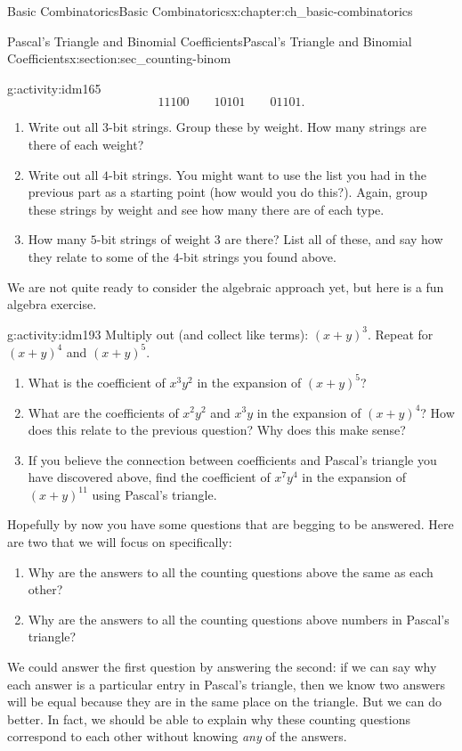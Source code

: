\documentclass[oneside,10pt,]{book}
\numberwithin{equation}{chapter}
\begin{document}
\begin{chapterptx}{Basic Combinatorics}{}{Basic Combinatorics}{}{}{x:chapter:ch_basic-combinatorics}
\begin{sectionptx}{Pascal's Triangle and Binomial Coefficients}{}{Pascal's Triangle and Binomial Coefficients}{}{}{x:section:sec_counting-binom}
\begin{activity}{}{g:activity:idm165}
\begin{equation*}
11100 \qquad 10101 \qquad 01101.
\end{equation*}
%
\begin{enumerate}[font=\bfseries,label=(\alph*),ref=\alph*]
\item{}Write out all \(3\)-bit strings.  Group these by weight.  How many strings are there of each weight?%
\item{}Write out all \(4\)-bit strings.  You might want to use the list you had in the previous part as a starting point (how would you do this?).  Again, group these strings by weight and see how many there are of each type.%
\item{}How many \(5\)-bit strings of weight 3 are there?  List all of these, and say how they relate to some of the \(4\)-bit strings you found above.%
\end{enumerate}
\end{activity}
We are not quite ready to consider the algebraic approach yet, but here is a fun algebra exercise.%
\begin{activity}{}{g:activity:idm193}%
Multiply out (and collect like terms): \((x+y)^3\).  Repeat for \((x+y)^4\) and \((x+y)^5\).%
\begin{enumerate}[font=\bfseries,label=(\alph*),ref=\alph*]
\item{}What is the coefficient of \(x^3y^2\) in the expansion of \((x+y)^5\)?%
\item{}What are the coefficients of \(x^2y^2\) and \(x^3y\) in the expansion of \((x+y)^4\)?  How does this relate to the previous question?  Why does this make sense?%
\item{}If you believe the connection between coefficients and Pascal's triangle you have discovered above, find the coefficient of \(x^7y^4\) in the expansion of \((x+y)^{11}\) using Pascal's triangle.%
\end{enumerate}
\end{activity}
Hopefully by now you have some questions that are begging to be answered.  Here are two that we will focus on specifically:%
\begin{enumerate}
\item{}Why are the answers to all the counting questions above the same as each other?%
\item{}Why are the answers to all the counting questions above numbers in Pascal's triangle?%
\end{enumerate}
%
\par
We could answer the first question by answering the second: if we can say why each answer is a particular entry in Pascal's triangle, then we know two answers will be equal because they are in the same place on the triangle.  But we can do better.  In fact, we should be able to explain why these counting questions correspond to each other without knowing \emph{any} of the answers.%

\end{sectionptx}
\end{chapterptx}
\end{document}
